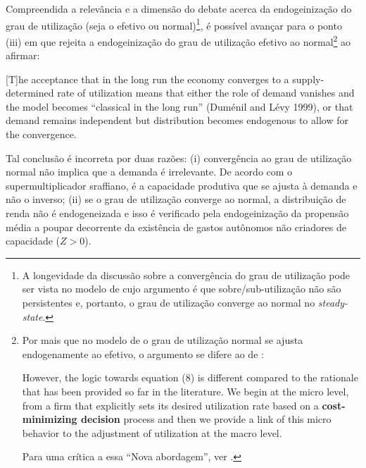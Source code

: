 Compreendida a relevância e a dimensão do debate acerca da endogeinização do grau de utilização (seja o efetivo ou normal)\footnote{
	A longevidade da discussão sobre a convergência do grau de utilização pode ser vista no modelo de \textcite{vianello_pace_1985} cujo argumento é que sobre/sub-utilização não são persistentes e, portanto, o grau de utilização converge ao normal no \textit{steady-state}.
}, é possível avançar para o ponto (iii) em que \citeauthor*{nikiforos_comments_2018} rejeita a endogeinização do grau de utilização efetivo ao normal\footnote{
	Por mais que no modelo de \textcite{nikiforos_utilization_2016} o grau de utilização normal se ajusta endogenamente ao efetivo, o argumento se difere ao de \textcite{amadeo_role_1986}:
	\begin{citacao}
		However, the logic towards equation (8) is different compared to the rationale that has been provided so far in the literature. We begin at the micro level, from a firm that explicitly sets its desired utilization rate based on a \textbf{cost-minimizing decision} process and then we provide a link of this micro behavior to the adjustment of utilization at the macro level. \cite[p.~456, grifos adicionados e numeração adaptada]{nikiforos_utilization_2016}
	\end{citacao}
	Para uma crítica a essa ``Nova abordagem'', ver \textcite{girardi_normal_2018}.
	
} ao afirmar:

\begin{citacao}
	
	[T]he acceptance that in the long run the economy converges to a supply-determined rate of utilization means that either the role of demand vanishes and the model becomes ``classical in the long run'' (Duménil and Lévy 1999), or that demand remains independent but distribution becomes endogenous to allow for the convergence. \cite[p.~9]{nikiforos_comments_2018}
\end{citacao}
Tal conclusão é incorreta por duas razões: (i) convergência ao grau de utilização normal não implica que a demanda é irrelevante. De acordo com o supermultiplicador sraffiano, é a capacidade produtiva que se ajusta à demanda e não o inverso; (ii) se o grau de utilização converge ao normal, a distribuição de renda não é endogeneizada e isso é verificado pela endogeinização da propensão média a poupar decorrente da existência de gastos autônomos não criadores de capacidade ($Z>0$).

